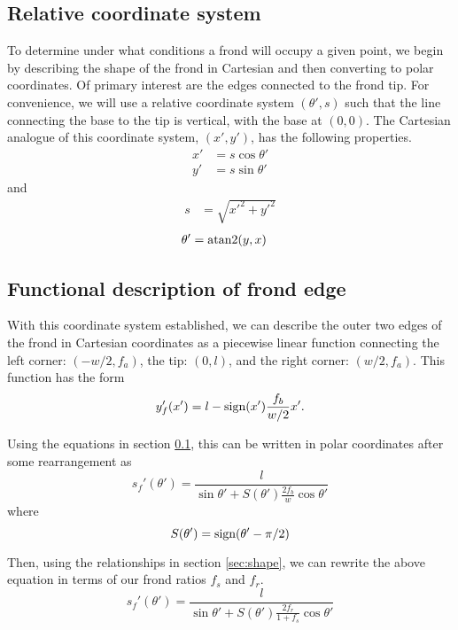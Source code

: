 \subsection{Relative coordinate system}
\label{sec:rel_coords}
To determine under what conditions a frond will occupy a given point, we begin by
describing the shape of the frond in Cartesian and then converting to polar coordinates.
Of primary interest are the edges connected to the frond tip.
For convenience, we will use a relative coordinate system $(\theta',s)$ such that the line connecting the base to the tip is vertical, with the base at $(0,0)$.
The Cartesian analogue of this coordinate system, $(x',y')$, has the following properties.
\begin{align}
	x' &= s\cos\theta' \\ 
	y' &= s\sin\theta'
\end{align}
and
\begin{align}
	s &= \sqrt{x'^2+y'^2}
\end{align}
\vspace{-1em}
\begin{align}
	\theta' &= \operatorname{atan2}(y, x)
\end{align}

\subsection{Functional description of frond edge}
With this coordinate system established, we can describe the outer two edges of the frond in Cartesian coordinates as a piecewise linear function connecting the left corner: $(-w/2,f_a)$, the tip: $(0,l)$, and the right corner: $(w/2,f_a)$.
This function has the form
\begin{equation}
	y'_f(x') = l-\mbox{sign}(x')\frac{f_b}{w/2}x'.
\end{equation}

Using the equations in section \ref{sec:rel_coords}, this can be written in polar coordinates after some rearrangement as
\begin{equation}
	s_f'(\theta') = \frac{l}{\sin\theta' + S(\theta')\frac{2f_b}{w}\cos\theta'}
\end{equation}
where
\begin{equation}
	S(\theta') = \mbox{sign}(\theta'-\pi/2)
\end{equation}

Then, using the relationships in section \ref{sec:shape}, we can rewrite the above equation in terms of our frond ratios $f_s$ and $f_r$.
\begin{equation}
	\label{eq:rf_rel}
	s_f'(\theta') = \frac{l}{\sin\theta' + S(\theta')\frac{2f_r}{1+f_s}\cos\theta'}
\end{equation}


